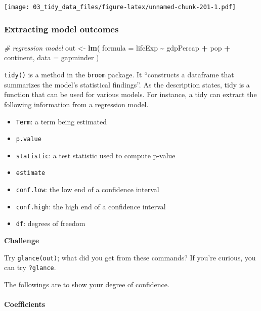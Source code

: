 \documentclass[
]{book}
\newenvironment{Shaded}{\begin{snugshade}}{\end{snugshade}}
\newcommand{\CommentTok}[1]{\textcolor[rgb]{0.56,0.35,0.01}{\textit{#1}}}
\newcommand{\DataTypeTok}[1]{\textcolor[rgb]{0.13,0.29,0.53}{#1}}
\newcommand{\KeywordTok}[1]{\textcolor[rgb]{0.13,0.29,0.53}{\textbf{#1}}}
\newcommand{\NormalTok}[1]{#1}
\newcommand{\OperatorTok}[1]{\textcolor[rgb]{0.81,0.36,0.00}{\textbf{#1}}}
\newcommand{\StringTok}[1]{\textcolor[rgb]{0.31,0.60,0.02}{#1}}
\providecommand{\tightlist}{%
  \setlength{\itemsep}{0pt}\setlength{\parskip}{0pt}}
\begin{document}
\texttt{[image: 03\_tidy\_data\_files/figure-latex/unnamed-chunk-201-1.pdf]}

\hypertarget{extracting-model-outcomes}{%
\subsubsection{Extracting model outcomes}\label{extracting-model-outcomes}}

\begin{Shaded}
\begin{Highlighting}[]
\CommentTok{\# regression model}
\NormalTok{out \textless{}{-}}\StringTok{ }\KeywordTok{lm}\NormalTok{(}
  \DataTypeTok{formula =}\NormalTok{ lifeExp }\OperatorTok{\textasciitilde{}}\StringTok{ }\NormalTok{gdpPercap }\OperatorTok{+}\StringTok{ }\NormalTok{pop }\OperatorTok{+}\StringTok{ }\NormalTok{continent,}
  \DataTypeTok{data =}\NormalTok{ gapminder}
\NormalTok{)}
\end{Highlighting}
\end{Shaded}

\texttt{tidy()} is a method in the \texttt{broom} package. It ``constructs a dataframe that summarizes the model's statistical findings''. As the description states, tidy is a function that can be used for various models. For instance, a tidy can extract the following information from a regression model.

\begin{itemize}
\tightlist
\item
  \texttt{Term}: a term being estimated
\item
  \texttt{p.value}
\item
  \texttt{statistic}: a test statistic used to compute p-value
\item
  \texttt{estimate}
\item
  \texttt{conf.low}: the low end of a confidence interval
\item
  \texttt{conf.high}: the high end of a confidence interval
\item
  \texttt{df}: degrees of freedom
\end{itemize}

\textbf{Challenge}

Try \texttt{glance(out)}; what did you get from these commands? If you're curious, you can try \texttt{?glance}.

The followings are to show your degree of confidence.

\hypertarget{coefficients}{%
\paragraph{Coefficients}\label{coefficients}}
\end{document}
